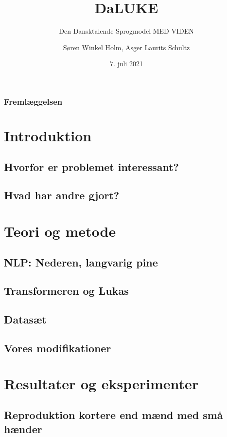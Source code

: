 \documentclass{beamer}
\title{DaLUKE}
\subtitle{
    Den Dansktalende Sprogmodel MED VIDEN
}
\author[Søren Holm, Asger Schultz]{Søren Winkel Holm, Asger Laurits Schultz}
\institute[DTU]{Danmarks Tekniske Universitet}
\date{7. juli 2021}
\begin{document}
\begin{frame}
    \titlepage
\end{frame}


\begin{frame}
    \frametitle{Fremlæggelsen}
    \footnotesize
    \tableofcontents
\end{frame}

\section{Introduktion}
\subsection{Hvorfor er problemet interessant?}
\subsection{Hvad har andre gjort?}

\section{Teori og metode}
\subsection{NLP: Nederen, langvarig pine}
\subsection{Transformeren og Lukas}
\subsection{Datasæt}
\subsection{Vores modifikationer}

\section{Resultater og eksperimenter}
\subsection{Reproduktion kortere end mænd med små hænder}
\end{document}
